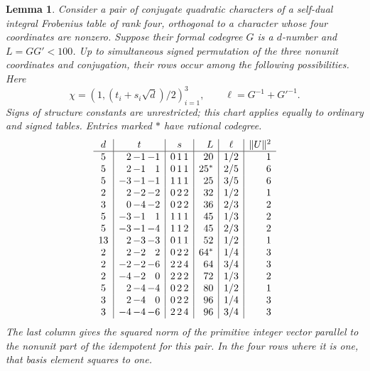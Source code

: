 \documentclass[11pt,a4paper]{article}
\newtheorem{lemma}[theorem]{Lemma}
\theoremstyle{definition}\newtheorem{definition}[theorem]{Definition}
\theoremstyle{remark}\newtheorem{remark}[theorem]{Remark}
\numberwithin{equation}{section}
\begin{document}
\begin{lemma}\label{qs:chart}
Consider a pair of conjugate quadratic characters of a self-dual
integral Frobenius table of rank four, orthogonal to a character
whose four coordinates are nonzero. Suppose their formal codegree
$G$ is a $d$-number and $L=GG'<100$. Up to simultaneous signed
permutation of the three nonunit coordinates and conjugation, their
rows occur among the following possibilities. Here
\[
 \chi=(1,(t_i+s_i\sqrt d)/2)_{i=1}^3,\qquad
 \ell=G^{-1}+G'^{-1}.
\]
Signs of structure constants are unrestricted; this chart applies
equally to ordinary and signed tables. Entries marked $*$ have
rational codegree.
\[
\begin{array}{c|r@{\,}r@{\,}r|r@{\,}r@{\,}r|r|c|r}
d&\multicolumn{3}{c|}{t}&\multicolumn{3}{c|}{s}&L&\ell&\|U\|^2\\\hline
5&2&-1&-1&0&1&1&20&1/2&1\\
5&2&-1&1&0&1&1&25^*&2/5&6\\
5&-3&-1&-1&1&1&1&25&3/5&6\\
2&2&-2&-2&0&2&2&32&1/2&1\\
3&0&-4&-2&0&2&2&36&2/3&2\\
5&-3&-1&1&1&1&1&45&1/3&2\\
5&-3&-1&-4&1&1&2&45&2/3&2\\
13&2&-3&-3&0&1&1&52&1/2&1\\
2&2&-2&2&0&2&2&64^*&1/4&3\\
2&-2&-2&-6&2&2&4&64&3/4&3\\
2&-4&-2&0&2&2&2&72&1/3&2\\
5&2&-4&-4&0&2&2&80&1/2&1\\
3&2&-4&0&0&2&2&96&1/4&3\\
3&-4&-4&-6&2&2&4&96&3/4&3
\end{array}
\]
The last column gives the squared norm of the primitive integer
vector parallel to the nonunit part of the idempotent for this pair.
In the four rows where it is one, that basis element squares to one.
\end{lemma}
\end{document}
